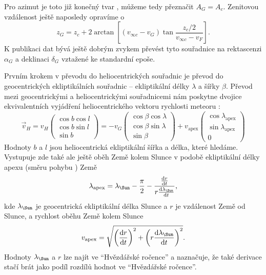 \smallskip

Pro azimut je toto již konečný tvar \cite{ceplecha}, můžeme tedy přeznačit $A_G=A_c$. Zenitovou vzdálenost ještě naposledy opravíme o \cite{ceplecha}
\begin{equation}
    z_G=z_c+2\arctan{\left[ (v_{\infty c}-v_G) \tan{\frac{z_c/2}{v_{\infty c} - v_F}}\right]}\text{.}
\end{equation}
K publikaci dat bývá ještě dobrým zvykem převést tyto souřadnice na rektascenzi $\alpha_G$ a deklinaci $\delta_G$ vztažené ke standardní epoše.

\medskip

Prvním krokem v převodu do heliocentrických souřadnic je převod do geocentrických ekliptikálních souřadnic -- ekliptikální délky $\lambda$ a šířky $\beta$. Převod mezi geocentrickými a heliocentrickými souřadnicemi nám poskytne dvojice ekvivalentních vyjádření heliocentrického vektoru rychlosti meteoru \cite{ceplecha}:
\begin{equation}
    \vec{v}_H=v_H\begin{pmatrix}
        \cos{b}\cos{l} \\
        \cos{b}\sin{l} \\
        \sin{b}
    \end{pmatrix}=-v_G\begin{pmatrix}
        \cos{\beta}\cos{\lambda} \\
        \cos{\beta}\sin{\lambda} \\
        \sin{\beta}
    \end{pmatrix}+v_\text{apex}\begin{pmatrix}
        \cos{\lambda_\text{apex}} \\
        \sin{\lambda_\text{apex}} \\
        0
    \end{pmatrix}
\end{equation}
Hodnoty $b$ a $l$ jsou heliocentrická ekliptikální šířka a délka, které hledáme. Vystupuje zde také ale ještě oběh Země kolem Slunce v podobě ekliptikální délky apexu (směru pohybu \cite{astro}) Země \cite{ceplecha}
\begin{equation}
    \lambda_\text{apex}=\lambda_\text{\Sun}-\frac{\pi}{2}-\frac{\frac{\text{d}r}{\text{d}t}}{r\frac{\text{d}\lambda_\text{\Sun}}{\text{d}t}}\text{,}
\end{equation}
kde $\lambda_\text{\Sun}$ je geocentrická ekliptikální délka Slunce a $r$ je vzdálenost Země od Slunce, a rychlost oběhu Země kolem Slunce \cite{ceplecha}
\begin{equation}
    v_\text{apex}=\sqrt{
        \left( \frac{\text{d}r}{\text{d}t} \right)^2+
        \left( r\frac{\text{d}\lambda_\text{\Sun}}{\text{d}t} \right)^2
    }\text{.}
\end{equation}
Hodnoty $\lambda_\text{\Sun}$ a $r$ lze najít ve "`Hvězdářské ročence"' a \cite{ceplecha} naznačuje, že také derivace stačí brát jako podíl rozdílů hodnot ve "`Hvězdářské ročence"'.

